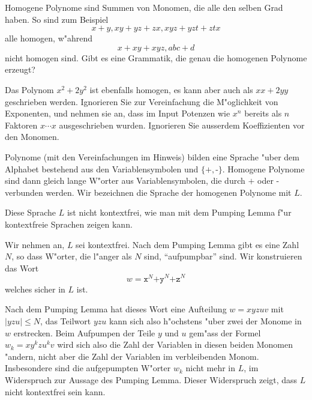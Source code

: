 Homogene Polynome sind Summen von Monomen, die alle den selben Grad haben.
So sind zum Beispiel 
\[
x+y, xy+yz+zx, xyz+yzt+ztx
\]
alle homogen, w"ahrend
\[
x+xy+xyz, abc+d
\]
nicht homogen sind. Gibt es eine Grammatik, die genau die homogenen Polynome
erzeugt?

\begin{hinweis}
Das Polynom $x^2+2y^2$ ist ebenfalls homogen, es kann aber auch als $xx+2yy$
geschrieben werden. 
Ignorieren Sie zur Vereinfachung die M"oglichkeit von Exponenten,
und nehmen sie an, dass im Input Potenzen wie $x^n$ bereits als
$n$ Faktoren $x\cdots x$ ausgeschrieben wurden.
Ignorieren Sie ausserdem Koeffizienten vor den Monomen.
\end{hinweis}

\begin{loesung}
Polynome (mit den Vereinfachungen im Hinweis) bilden eine Sprache
"uber dem Alphabet bestehend aus
den Variablensymbolen und $\{\texttt{+},\texttt{-}\}$.
Homogene Polynome sind
dann gleich lange W"orter aus Variablensymbolen, die durch
$\texttt{+}$ oder $\texttt{-}$ verbunden werden. Wir bezeichnen die
Sprache der homogenen Polynome mit $L$.

Diese Sprache $L$ ist nicht kontextfrei, wie man mit dem Pumping Lemma
f"ur kontextfreie Sprachen zeigen kann.

Wir nehmen an, $L$ sei kontextfrei. Nach dem Pumping Lemma
gibt es eine Zahl $N$, so dass W"orter, die l"anger als $N$ sind,
``aufpumpbar'' sind. Wir konstruieren das Wort
\[
w=\texttt{x}^N\texttt{+y}^N\texttt{+z}^N
\]
welches sicher in $L$ ist.

Nach dem Pumping Lemma hat dieses Wort eine Aufteilung
$w=xyzuv$ mit $|yzu|\le N$, das Teilwort $yzu$ kann sich also 
h"ochstens "uber zwei der Monome in $w$ erstrecken.
Beim Aufpumpen der Teile $y$ und $u$ gem"ass der Formel
$w_k=xy^kzu^kv$ wird sich also die Zahl der Variablen in diesen
beiden Monomen "andern, nicht aber die Zahl der Variablen im 
verbleibenden Monom. Insbesondere sind die aufgepumpten W"orter $w_k$
nicht mehr in $L$, im Widerspruch zur Aussage des Pumping Lemma.
Dieser Widerspruch zeigt, dass $L$ nicht kontextfrei sein kann.
\end{loesung}

